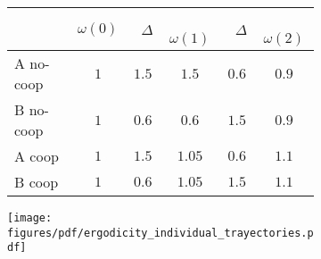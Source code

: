 \documentclass[a4paper,10pt]{article}
\newif\ifen
\newif\ifes
\newcommand{\en}[1]{\ifen#1 \fi}
\newcommand{\es}[1]{\ifes#1 \fi}
\begin{document}
\begin{figure}[ht!]
\vspace{-0.1cm}
\centering
 \begin{subfigure}[c]{0.50\textwidth}
 \centering
  \begin{tabular}{|l|c|c|c|c|c|}
     \hline
         & {\small $\omega(0)$} & {\small \  $\Delta$}  & {\small \, $\omega(1)$ } & {\small \  $\Delta$}  & {\small \,  $\omega(2)$ }  \\ \hline \hline
        A no-coop& $1$ & $1.5$ &  $1.5$ & $0.6$ & $\bm{0.9}$ \\ \hline
        B no-coop & $1$ & $0.6$ & $0.6$ & $1.5$ & $\bm{0.9}$ \\ \hline\hline
        A coop & $1$ & $1.5$ & $1.05$ & $0.6$ & $\bm{1.1}$ \\ \hline
        B coop & $1$ & $0.6$ & $1.05$ & $1.5$ & $\bm{1.1}$\\ \hline
\end{tabular}
 \end{subfigure}
 \begin{subfigure}[c]{0.45\textwidth}
\begin{flushright}
 \texttt{[image: figures/pdf/ergodicity\_individual\_trayectories.pdf]}
 \end{flushright}
 \end{subfigure}
 \caption{
 \en{Reducing fluctuations through cooperation allows individuals to reach growth rates they would never achieve alone.}%
 \es{Reducir fluctuaciones por cooperación le permite a los individuos alcanzar tasas de crecimiento que jamás obtendrían solos.}%
 \en{In the table (left) $\Delta$ represents the change in resources experienced by individuals at random.}%
 \es{En la tabla (izquierda) $\Delta$ representa el cambio en los recursos que sufren los individuos de forma aleatoria.}%
 \en{In the figure (right), the colored curves are the trajectories of individuals playing alone, and the black line is the trajectory of individuals playing in cooperative groups.}%
 \es{En la figura (derecha), las curvas de colores son las trayectorias de los individuos jugando solos, y la recta negra es la trayectoria de los individuos jugando en grupos cooperativos.}%
 }
 \label{fig:coop}
 \vspace{-0.1cm}
 \end{figure}


\end{document}
